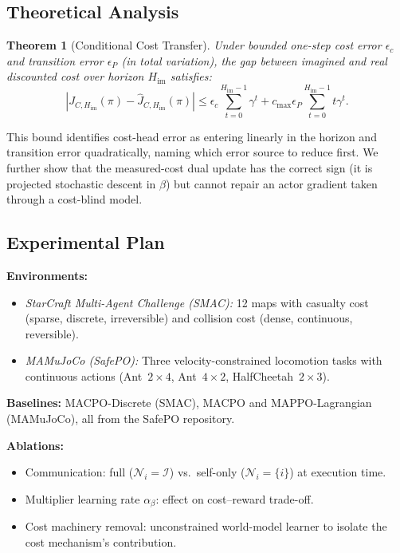 \documentclass[12pt,a4paper]{article}
\newtheorem{theorem}{Theorem}
\begin{document}
\subsection{Theoretical Analysis}

\begin{theorem}[Conditional Cost Transfer]
Under bounded one-step cost error $\epsilon_c$ and transition error $\epsilon_P$ (in total variation), the gap between imagined and real discounted cost over horizon $H_{\mathrm{im}}$ satisfies:
\[
|J_{C,H_{\mathrm{im}}}(\pi) - \widehat{J}_{C,H_{\mathrm{im}}}(\pi)| \leq \epsilon_c \sum_{t=0}^{H_{\mathrm{im}}-1} \gamma^t + c_{\max} \epsilon_P \sum_{t=0}^{H_{\mathrm{im}}-1} t\gamma^t.
\]
\end{theorem}

This bound identifies cost-head error as entering linearly in the horizon and transition error quadratically, naming which error source to reduce first.
We further show that the measured-cost dual update has the correct sign (it is projected stochastic descent in $\beta$) but cannot repair an actor gradient taken through a cost-blind model.

\subsection{Experimental Plan}

\textbf{Environments:}
\begin{itemize}[leftmargin=1.5em]
    \item \emph{StarCraft Multi-Agent Challenge (SMAC):} 12 maps with casualty cost (sparse, discrete, irreversible) and collision cost (dense, continuous, reversible).
    \item \emph{MAMuJoCo (SafePO):} Three velocity-constrained locomotion tasks with continuous actions (Ant~$2{\times}4$, Ant~$4{\times}2$, HalfCheetah~$2{\times}3$).
\end{itemize}

\textbf{Baselines:} MACPO-Discrete (SMAC), MACPO and MAPPO-Lagrangian (MAMuJoCo), all from the SafePO repository.

\textbf{Ablations:}
\begin{itemize}[leftmargin=1.5em]
    \item Communication: full ($\mathcal{N}_i = \mathcal{I}$) vs.\ self-only ($\mathcal{N}_i = \{i\}$) at execution time.
    \item Multiplier learning rate $\alpha_\beta$: effect on cost--reward trade-off.
    \item Cost machinery removal: unconstrained world-model learner to isolate the cost mechanism's contribution.
\end{itemize}
\end{document}
